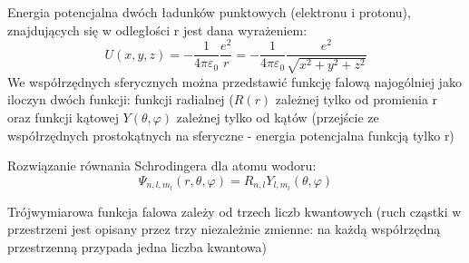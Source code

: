 \documentclass[a4paper,11pt]{article}
\begin{document}
\begin{description}
  Energia potencjalna dwóch ładunków punktowych (elektronu i protonu), znajdujących się w odległości r jest dana wyrażeniem:
  $$U(x,y,z) = - \frac{1}{4\pi\varepsilon_0}\frac{e^2}{r}=-\frac{1}{4\pi\varepsilon_0}\frac{e^2}{\sqrt{x^2+y^2+z^2}}$$
  We współrzędnych sferycznych można przedstawić funkcję falową najogólniej jako iloczyn dwóch funkcji: funkcji radialnej ($R(r)$ zależnej tylko od promienia r oraz funkcji kątowej $Y(\theta, \varphi)$ zależnej tylko od kątów (przejście ze współrzędnych prostokątnych na sferyczne - energia potencjalna funkcją tylko r)

  Rozwiązanie równania Schrodingera dla atomu wodoru:
  $$\Psi_{n,l,m_l}\left(r,\theta,\varphi\right)=R_{n,l}Y_{l,m_l}\left(\theta,\varphi\right)$$ 

  Trójwymiarowa funkcja falowa zależy od trzech liczb kwantowych (ruch cząstki w przestrzeni jest opisany przez trzy niezależnie zmienne: na każdą współrzędną przestrzenną przypada jedna liczba kwantowa)


\end{description}
\end{document}
